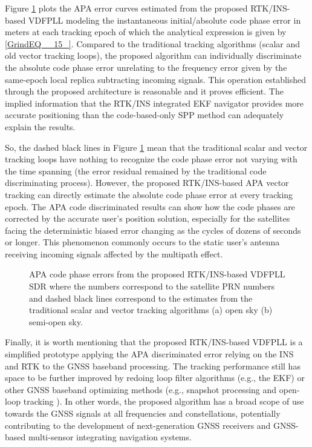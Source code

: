 \documentclass{article}
\newcommand{\reffig}[1]{Figure \ref{#1}}
\begin{document}
\reffig{fig:fig18} plots the APA error curves estimated from the proposed RTK/INS-based VDFPLL modeling the instantaneous initial/absolute code phase error in meters at each tracking epoch of which the analytical expression is given by \eqref{GrindEQ__15_}. Compared to the traditional tracking algorithms (scalar and old vector tracking loops), the proposed algorithm can individually discriminate the absolute code phase error unrelating to the frequency error given by the same-epoch local replica subtracting incoming signals. This operation established through the proposed architecture is reasonable and it proves efficient. The implied information that the RTK/INS integrated EKF navigator provides more accurate positioning than the code-based-only SPP method can adequately explain the results. 

So, the dashed black lines in \reffig{fig:fig18} mean that the traditional scalar and vector tracking loops have nothing to recognize the code phase error not varying with the time spanning (the error residual remained by the traditional code discriminating process). However, the proposed RTK/INS-based APA vector tracking can directly estimate the absolute code phase error at every tracking epoch. The APA code discriminated results can show how the code phases are corrected by the accurate user's position solution, especially for the satellites facing the deterministic biased error changing as the cycles of dozens of seconds or longer. This phenomenon commonly occurs to the static user's antenna receiving incoming signals affected by the multipath effect. 

\begin{figure}[htbp]%
\centering
{}%
\hfil
{}%
\caption{APA code phase errors from the proposed RTK/INS-based VDFPLL SDR where the numbers correspond to the satellite PRN numbers and dashed black lines correspond to the estimates from the traditional scalar and vector tracking algorithms (a) open sky (b) semi-open sky. }
\label{fig:fig18}
\end{figure}

Finally, it is worth mentioning that the proposed RTK/INS-based VDFPLL is a simplified prototype applying the APA discriminated error relying on the INS and RTK to the GNSS baseband processing. The tracking performance still has space to be further improved by redoing loop filter algorithms (e.g., the EKF) or other GNSS baseband optimizing methods (e.g., snapshot processing \cite{Luo2022up,Fernandez-Hernandez2022} and open-loop tracking \cite{Tsang2022,VanGraas2009}). In other words, the proposed algorithm has a broad scope of use towards the GNSS signals at all frequencies and constellations, potentially contributing to the development of next-generation GNSS receivers and GNSS-based multi-sensor integrating navigation systems.  
\end{document}
